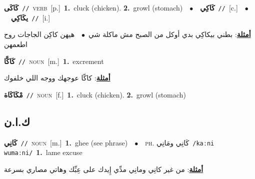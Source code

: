 \documentclass[10pt,a4paper,twoside]{article} %
\begin{document}
\begin{multicols}{2}
{\setlength\topsep{0pt}\textbf{\foreignlanguage{arabic}{كَاكَى}}\ {\color{gray}\texttt{//}\color{black}}\ \textsc{verb}\ [p.]\ \textbf{1.}~cluck (chicken).  \textbf{2.}~growl (stomach)\ \ $\bullet$\ \ \setlength\topsep{0pt}\textbf{\foreignlanguage{arabic}{كَاكِي}}\ {\color{gray}\texttt{//}\color{black}}\ [c.]\ \ $\bullet$\ \ \setlength\topsep{0pt}\textbf{\foreignlanguage{arabic}{يكَاكِي}}\ {\color{gray}\texttt{//}\color{black}}\ [i.]\  \begin{flushright}\color{gray}\foreignlanguage{arabic}{\textbf{\underline{\foreignlanguage{arabic}{أمثلة}}}: بطني بيكاكِي بدي أوكل من الصبح مش ماكلة شي\ $\bullet$\ \  هيهن كاكِن الجاجات روح اطعمهن}\end{flushright}\color{black}} \vspace{2mm}

{\setlength\topsep{0pt}\textbf{\foreignlanguage{arabic}{كَاكَّا}}\ {\color{gray}\texttt{//}\color{black}}\ \textsc{noun}\ [m.]\ \textbf{1.}~excrement\  \begin{flushright}\color{gray}\foreignlanguage{arabic}{\textbf{\underline{\foreignlanguage{arabic}{أمثلة}}}: كاكّا عوجهك ووجه اللي خلفوك}\end{flushright}\color{black}} \vspace{2mm}

{\setlength\topsep{0pt}\textbf{\foreignlanguage{arabic}{مْكَاكَاة}}\ {\color{gray}\texttt{//}\color{black}}\ \textsc{noun}\ [f.]\ \textbf{1.}~cluck (chicken).  \textbf{2.}~growl (stomach)\ } \vspace{2mm}

\vspace{-3mm}
\subsection*{\color{blue}\foreignlanguage{arabic}{ك.ا.ن}\color{blue}{ (ntws)}} 

{\setlength\topsep{0pt}\textbf{\foreignlanguage{arabic}{كَانِي}}\ {\color{gray}\texttt{//}\color{black}}\ \textsc{noun}\ [m.]\ \textbf{1.}~ghee (see phrase)\ \ $\bullet$\ \ \textsc{ph.} \color{gray} \foreignlanguage{arabic}{كَانِي ومَانِي}\color{black}\ {\color{gray}\texttt{/{\sffamily kaːni wumaːni}/}\color{black}}\ \textbf{1.}~lame excuse\  \begin{flushright}\color{gray}\foreignlanguage{arabic}{\textbf{\underline{\foreignlanguage{arabic}{أمثلة}}}: من غير كانِي ومانِي مدِّي إِيدك على عِبِّك وهاتي مصاري بسرعة}\end{flushright}\color{black}} \vspace{2mm}


\end{multicols}
\end{document}
